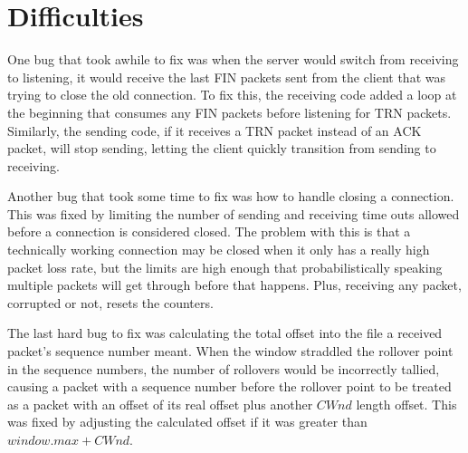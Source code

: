 \documentclass[letterpaper,twocolumn,10pt]{article}
\begin{document}
\section{Difficulties}
One bug that took awhile to fix was when the server would switch from receiving to listening, it would receive the last FIN packets sent from the client that was trying to close the old connection.
To fix this, the receiving code added a loop at the beginning that consumes any FIN packets before listening for TRN packets.
Similarly, the sending code, if it receives a TRN packet instead of an ACK packet, will stop sending, letting the client quickly transition from sending to receiving.

Another bug that took some time to fix was how to handle closing a connection.
This was fixed by limiting the number of sending and receiving time outs allowed before a connection is considered closed.
The problem with this is that a technically working connection may be closed when it only has a really high packet loss rate, but the limits are high enough that probabilistically speaking multiple packets will get through before that happens.
Plus, receiving any packet, corrupted or not, resets the counters.

The last hard bug to fix was calculating the total offset into the file a received packet's sequence number meant.
When the window straddled the rollover point in the sequence numbers, the number of rollovers would be incorrectly tallied, causing a packet with a sequence number before the rollover point to be treated as a packet with an offset of its real offset plus another $CWnd$ length offset.
This was fixed by adjusting the calculated offset if it was greater than $window.max + CWnd$.

\theendnotes
\end{document}
